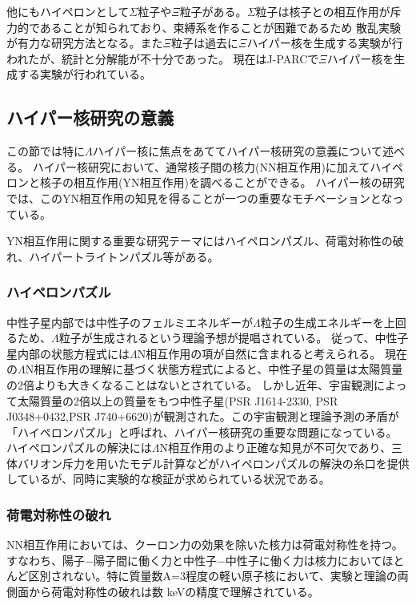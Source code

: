 \documentclass[a4paper,11pt,uplatex]{jsbook}
\begin{document}
他にもハイペロンとして$\Sigma$粒子や$\Xi$粒子がある。$\Sigma$粒子は核子との相互作用が斥力的であることが知られており、束縛系を作ることが困難であるため
散乱実験が有力な研究方法となる。また$\Xi$粒子は過去に$\Xi$ハイパー核を生成する実験が行われた\cite{fukuda,khaustov}が、統計と分解能が不十分であった。
現在はJ-PARCで$\Xi$ハイパー核を生成する実験が行われている。

\subsection{ハイパー核研究の意義}
この節では特に$\Lambda$ハイパー核に焦点をあててハイパー核研究の意義について述べる。
ハイパー核研究において、通常核子間の核力(NN相互作用)に加えてハイペロンと核子の相互作用(YN相互作用)を調べることができる。
ハイパー核の研究では、このYN相互作用の知見を得ることが一つの重要なモチベーションとなっている。

YN相互作用に関する重要な研究テーマにはハイペロンパズル、荷電対称性の破れ、ハイパートライトンパズル等がある。
\subsubsection{ハイペロンパズル}
中性子星内部では中性子のフェルミエネルギーが$\Lambda$粒子の生成エネルギーを上回るため、$\Lambda$粒子が生成されるという理論予想が提唱されている\cite{Ambartsumyan}。
従って、中性子星内部の状態方程式には$\Lambda$N相互作用の項が自然に含まれると考えられる。
現在の$\Lambda$N相互作用の理解に基づく状態方程式によると、中性子星の質量は太陽質量の2倍よりも大きくなることはないとされている\cite{schulze}。
しかし近年、宇宙観測によって太陽質量の2倍以上の質量をもつ中性子星(PSR J1614-2330\cite{demorest2010}, PSR J0348+0432\cite{antoniadis2013},PSR J740+6620\cite{cromartie2019})が観測された。この宇宙観測と理論予測の矛盾が「ハイペロンパズル」と呼ばれ、ハイパー核研究の重要な問題になっている。
ハイペロンパズルの解決には$\Lambda$N相互作用のより正確な知見が不可欠であり、三体バリオン斥力を用いたモデル計算\cite{yamamoto2014}などがハイペロンパズルの解決の糸口を提供しているが、同時に実験的な検証が求められている状況である。

\subsubsection{荷電対称性の破れ}
NN相互作用においては、クーロン力の効果を除いた核力は荷電対称性を持つ。すなわち、陽子$-$陽子間に働く力と中性子$-$中性子に働く力は核力においてほとんど区別されない。特に質量数A=3程度の軽い原子核において、実験と理論の両側面から荷電対称性の破れは数 keVの精度で理解されている\cite{Audi,NagaoD,friar1970, coon}。
\end{document}
